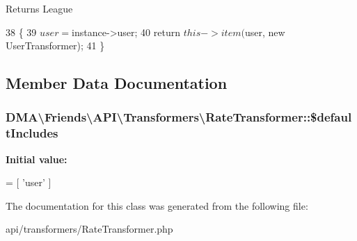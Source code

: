 \begin{DoxyReturn}{Returns}
League 
\end{DoxyReturn}

\begin{DoxyCode}
38     \{
39         $user = $instance->user;
40         \textcolor{keywordflow}{return} $this->item($user, \textcolor{keyword}{new} UserTransformer);
41     \}
\end{DoxyCode}


\subsection{Member Data Documentation}
\hypertarget{classDMA_1_1Friends_1_1API_1_1Transformers_1_1RateTransformer_a7bd7d6cf2606a64b75c5c677602ebb04}{}
\subsubsection[{\$default\+Includes}]{\setlength{\rightskip}{0pt plus 5cm}D\+M\+A\textbackslash{}\+Friends\textbackslash{}\+A\+P\+I\textbackslash{}\+Transformers\textbackslash{}\+Rate\+Transformer\+::\$default\+Includes\hspace{0.3cm}{\ttfamily [protected]}}\label{classDMA_1_1Friends_1_1API_1_1Transformers_1_1RateTransformer_a7bd7d6cf2606a64b75c5c677602ebb04}
{\bfseries Initial value\+:}
\begin{DoxyCode}
= [
            \textcolor{stringliteral}{'user'}
    ]
\end{DoxyCode}


The documentation for this class was generated from the following file\+:\begin{DoxyCompactItemize}
\item 
api/transformers/Rate\+Transformer.\+php\end{DoxyCompactItemize}
